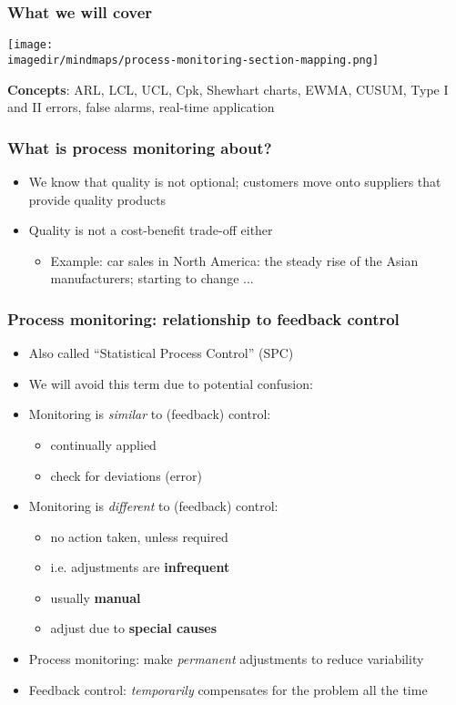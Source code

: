 \begin{frame}\frametitle{What we will cover}

	\texttt{[image: \\imagedir/mindmaps/process-monitoring-section-mapping.png]}

	\textbf{Concepts}: ARL, LCL, UCL, Cpk, Shewhart charts, EWMA, CUSUM, Type I and II errors, false alarms, real-time application
\end{frame}

\begin{frame}\frametitle{What is process monitoring about?}
	\begin{itemize}
		\item	We know that quality is not optional; customers move onto suppliers that provide quality products
		\item	Quality is not a cost-benefit trade-off either
		\begin{itemize}
			\item	Example: car sales in North America: the steady rise of the Asian manufacturers; starting to change ...
		\end{itemize}
	\end{itemize}
\end{frame}

\begin{frame}\frametitle{Process monitoring: relationship to feedback control}
	\begin{itemize}
		\item	Also called ``Statistical Process Control'' (SPC)
		\item	We will avoid this term due to potential confusion:
		\item	Monitoring is \emph{similar} to (feedback) control:
		\begin{itemize}
			\item	continually applied
			\item	check for deviations (error)
		\end{itemize}
		\item	Monitoring is \emph{different} to (feedback) control:
		\begin{itemize}
			\item	no action taken, unless required
			\item	i.e. adjustments are \textbf{infrequent}
			\item	usually \textbf{manual}
			\item	adjust due to \textbf{special causes}
		\end{itemize}
	\end{itemize}
	\begin{itemize}
		\item	Process monitoring: make \emph{permanent} adjustments to reduce variability
		\item	Feedback control: \emph{temporarily} compensates for the problem all the time
	\end{itemize}
\end{frame}


